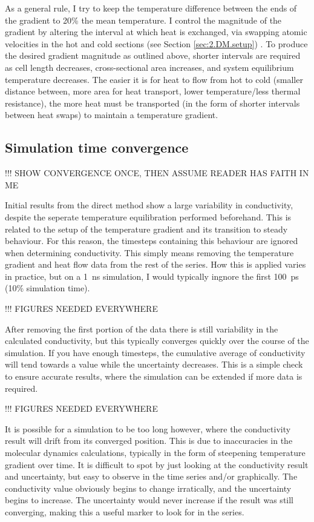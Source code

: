 As a general rule, I try to keep the temperature difference between the ends of the gradient to 20\% the mean temperature. I control the magnitude of the gradient by altering the interval at which heat is exchanged, via swapping atomic velocities in the hot and cold sections (see Section \ref{sec:2.DM.setup}) . To produce the desired gradient magnitude as outlined above, shorter intervals are required as cell length decreases, cross-sectional area increases, and system equilibrium temperature decreases. The easier it is for heat to flow from hot to cold (smaller distance between, more area for heat transport, lower temperature/less thermal resistance), the more heat must be transported (in the form of shorter intervals between heat swaps) to maintain a temperature gradient.


\subsection{\label{sec:3.DM.time}Simulation time convergence}

!!! SHOW CONVERGENCE ONCE, THEN ASSUME READER HAS FAITH IN ME

Initial results from the direct method show a large variability in conductivity, despite the seperate temperature equilibration performed beforehand. This is related to the setup of the temperature gradient and its transition to steady behaviour. For this reason, the timesteps containing this behaviour are ignored when determining conductivity. This simply means removing the temperature gradient and heat flow data from the rest of the series. How this is applied varies in practice, but on a 1~ns simulation, I would typically ingnore the first 100~ps (10\% simulation time).

!!! FIGURES NEEDED EVERYWHERE

After removing the first portion of the data there is still variability in the calculated conductivity, but this typically converges quickly over the course of the simulation. If you have enough timesteps, the cumulative average of conductivity will tend towards a value while the uncertainty decreases. This is a simple check to ensure accurate results, where the simulation can be extended if more data is required.

!!! FIGURES NEEDED EVERYWHERE

It is possible for a simulation to be too long however, where the conductivity result will drift from its converged position. This is due to inaccuracies in the molecular dynamics calculations, typically in the form of steepening temperature gradient over time. It is difficult to spot by just looking at the conductivity result and uncertainty, but easy to observe in the time series and/or graphically. The conductivity value obviously begins to change irratically, and the uncertainty begins to increase. The uncertainty would never increase if the result was still converging, making this a useful marker to look for in the series.

